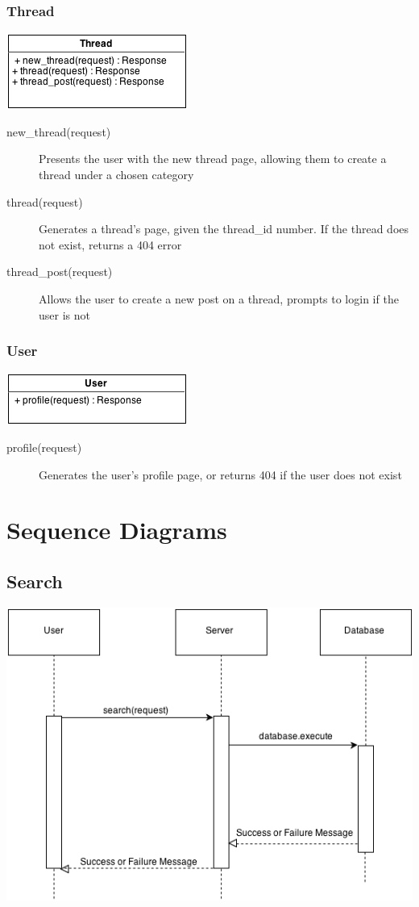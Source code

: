 \documentclass[12pt]{scrartcl}
\begin{document}
\subsubsection{Thread}
\includegraphics[keepaspectratio]{umls/thread_uml.png}
\begin{description}
\item [new\_thread(request)] Presents the user with the new thread page, allowing them to create a thread under a chosen category
\item [thread(request)] Generates a thread’s page, given the thread\_id number. If the thread does not exist, returns a 404 error
\item [thread\_post(request)] Allows the user to create a new post on a thread, prompts to login if the user is not
\end{description}

\subsubsection{User}
\includegraphics[keepaspectratio]{umls/user_uml.png}
\begin{description}
\item [profile(request)] Generates the user’s profile page, or returns 404 if the user does not exist
\end{description}

\section{Sequence Diagrams}
\subsection{Search}
\includegraphics[keepaspectratio, scale=0.85]{sequence/search.png}
\end{document}
